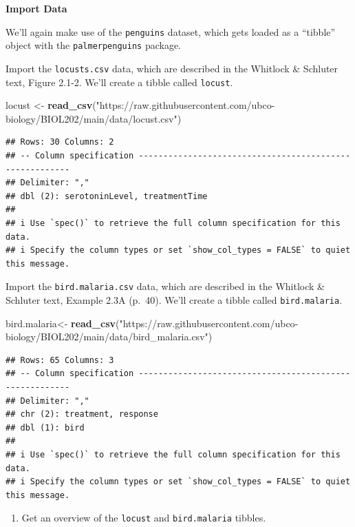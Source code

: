 \documentclass[
]{book}
\newenvironment{Shaded}{\begin{snugshade}}{\end{snugshade}}
\newcommand{\FunctionTok}[1]{\textcolor[rgb]{0.13,0.29,0.53}{\textbf{#1}}}
\newcommand{\NormalTok}[1]{#1}
\newcommand{\OtherTok}[1]{\textcolor[rgb]{0.56,0.35,0.01}{#1}}
\newcommand{\StringTok}[1]{\textcolor[rgb]{0.31,0.60,0.02}{#1}}
\providecommand{\tightlist}{%
  \setlength{\itemsep}{0pt}\setlength{\parskip}{0pt}}
\begin{document}
\textbf{Import Data}

We'll again make use of the \texttt{penguins} dataset, which gets loaded as a ``tibble'' object with the \texttt{palmerpenguins} package.

Import the \texttt{locusts.csv} data, which are described in the Whitlock \& Schluter text, Figure 2.1-2. We'll create a tibble called \texttt{locust}.

\begin{Shaded}
\begin{Highlighting}[]
\NormalTok{locust }\OtherTok{\textless{}{-}} \FunctionTok{read\_csv}\NormalTok{(}\StringTok{"https://raw.githubusercontent.com/ubco{-}biology/BIOL202/main/data/locust.csv"}\NormalTok{)}
\end{Highlighting}
\end{Shaded}

\begin{verbatim}
## Rows: 30 Columns: 2
## -- Column specification --------------------------------------------------------
## Delimiter: ","
## dbl (2): serotoninLevel, treatmentTime
## 
## i Use `spec()` to retrieve the full column specification for this data.
## i Specify the column types or set `show_col_types = FALSE` to quiet this message.
\end{verbatim}

Import the \texttt{bird.malaria.csv} data, which are described in the Whitlock \& Schluter text, Example 2.3A (p.~40). We'll create a tibble called \texttt{bird.malaria}.

\begin{Shaded}
\begin{Highlighting}[]
\NormalTok{bird.malaria}\OtherTok{\textless{}{-}} \FunctionTok{read\_csv}\NormalTok{(}\StringTok{"https://raw.githubusercontent.com/ubco{-}biology/BIOL202/main/data/bird\_malaria.csv"}\NormalTok{)}
\end{Highlighting}
\end{Shaded}

\begin{verbatim}
## Rows: 65 Columns: 3
## -- Column specification --------------------------------------------------------
## Delimiter: ","
## chr (2): treatment, response
## dbl (1): bird
## 
## i Use `spec()` to retrieve the full column specification for this data.
## i Specify the column types or set `show_col_types = FALSE` to quiet this message.
\end{verbatim}

\begin{enumerate}
\def\labelenumi{\arabic{enumi}.}
\tightlist
\item
  Get an overview of the \texttt{locust} and \texttt{bird.malaria} tibbles.
\end{enumerate}
\end{document}
